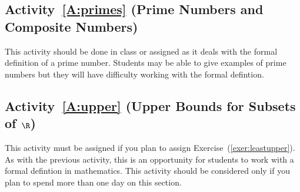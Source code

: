 %



%

\subsection*{Activity~\ref{A:primes} (Prime Numbers and Composite Numbers)}
This activity should be done in class or assigned as it deals with the formal definition of a prime number.  Students may be able to give examples of prime numbers but they will have difficulty working with the formal defintion.

\subsection*{Activity~\ref{A:upper} (Upper Bounds for Subsets of $\boldsymbol{\R}$)}
This activity must be assigned if you plan to assign Exercise~(\ref{exer:leastupper}).  As with the previous activity, this is an opportunity for students to work with a formal defintion in mathematics.  This activity should be considered only if you plan to spend more than one day on this section.

